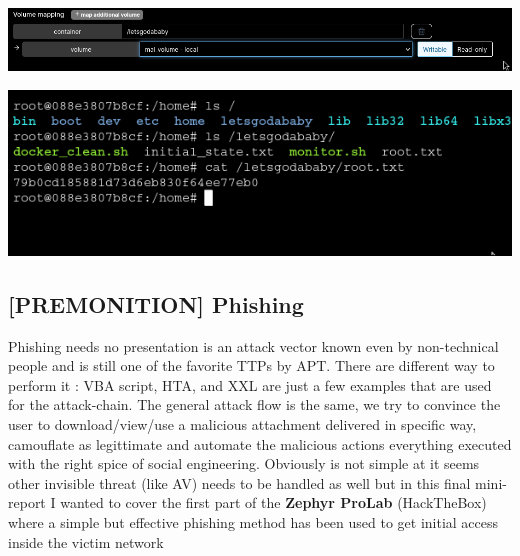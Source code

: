 \documentclass[a4paper]{article}
\begin{document}
              \begin{minipage}[c]{\textwidth}
          \centering
          \includegraphics[width=\textwidth]{src/issues/4 - RUNNER/issue43.png}
          \label{4:RUNNER:issue.md:issue43.png}
          \vspace{4ex}
        \end{minipage}
              \begin{minipage}[c]{\textwidth}
          \centering
          \includegraphics[width=\textwidth]{src/issues/4 - RUNNER/issue44.png}
          \label{4:RUNNER:issue.md:issue44.png}
          \vspace{4ex}
        \end{minipage}
          
    \clearpage

    

      \newpage
    
    \subsection{[PREMONITION] Phishing}
    \label{5:PREMONITION:issue.md}

    Phishing needs no presentation is an attack vector known even by non-technical people and is still one of the favorite TTPs by APT. There are different
way to perform it : VBA script, HTA, and XXL are just a few examples that are used for the attack-chain. The general attack flow is the same, we try to convince
the user to download/view/use a malicious attachment delivered in specific way, camouflate as legittimate and automate the malicious actions everything executed with
the right spice of social engineering. Obviously is not simple at it seems other invisible threat (like AV) needs to be handled as well but in this final mini-report I wanted
to cover the first part of the \textbf{Zephyr ProLab} (HackTheBox) where a simple but effective phishing method has been used to get initial access inside the victim network
\end{document}
